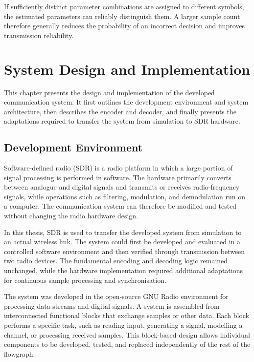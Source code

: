 \documentclass[a4paper, 12pt, openany]{book}
\begin{document}
If sufficiently distinct parameter combinations are assigned to different symbols, the estimated parameters can reliably distinguish them. A larger sample count therefore generally reduces the probability of an incorrect decision and improves transmission reliability.

\chapter{System Design and Implementation}

This chapter presents the design and implementation of the developed communication system. It first outlines the development environment and system architecture, then describes the encoder and decoder, and finally presents the adaptations required to transfer the system from simulation to SDR hardware.

\section{Development Environment}

Software-defined radio (SDR) is a radio platform in which a large portion of signal processing is performed in software. The hardware primarily converts between analogue and digital signals and transmits or receives radio-frequency signals, while operations such as filtering, modulation, and demodulation run on a computer. The communication system can therefore be modified and tested without changing the radio hardware design.

In this thesis, SDR is used to transfer the developed system from simulation to an actual wireless link. The system could first be developed and evaluated in a controlled software environment and then verified through transmission between two radio devices. The fundamental encoding and decoding logic remained unchanged, while the hardware implementation required additional adaptations for continuous sample processing and synchronisation.

The system was developed in the open-source GNU Radio environment \cite{gnuradioWebsite} for processing data streams and digital signals. A system is assembled from interconnected functional blocks that exchange samples or other data. Each block performs a specific task, such as reading input, generating a signal, modelling a channel, or processing received samples. This block-based design allows individual components to be developed, tested, and replaced independently of the rest of the flowgraph.
\end{document}
